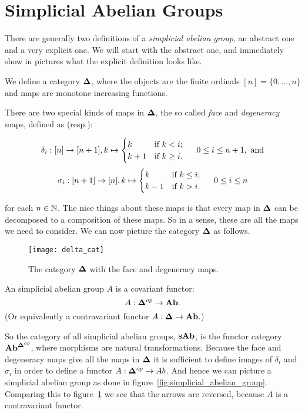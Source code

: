\section{Simplicial Abelian Groups}
\label{sec:Simplicial Abelian Groups}

There are generally two definitions of a \emph{simplicial abelian group}, an abstract one and a very explicit one. We will start with the abstract one, and immediately show in pictures what the explicit definition looks like.

\begin{definition}
	We define a category $\mathbf{\Delta}$, where the objects are the finite ordinals $[n] = \{0, \dots, n\}$ and maps are monotone increasing functions.
\end{definition}

There are two special kinds of maps in $\mathbf{\Delta}$, the so called \emph{face} and \emph{degeneracy} maps, defined as (resp.):

$$\delta_i: [n] \to [n+1], k \mapsto \begin{cases} k & \text{if } k < i;\\ k+1 & \text{if } k \geq i. \end{cases} \hspace{0.5cm} 0 \leq i \leq n+1, \text{ and}$$
$$\sigma_i: [n+1] \to [n], k \mapsto \begin{cases} k & \text{if } k \leq i;\\ k-1 & \text{if } k > i. \end{cases} \hspace{0.5cm} 0 \leq i \leq n$$

for each $n \in \mathbb{N}$. The nice things about these maps is that every map in $\mathbf{\Delta}$ can be decomposed to a composition of these maps.  So in a sense, these are all the maps we need to consider. We can now picture the category $\mathbf{\Delta}$ as follows.

\begin{figure}[h!]
	\label{fig:delta_cat}
	\texttt{[image: delta\_cat]}
	\caption{The category $\mathbf{\Delta}$ with the face and degeneracy maps.}
\end{figure}

\begin{definition}
	An simplicial abelian group $A$ is a covariant functor:
	$$A: \mathbf{\Delta}^{op} \to \mathbf{Ab}.$$
	(Or equivalently a contravariant functor $A: \mathbf{\Delta} \to \mathbf{Ab}.$)
\end{definition}

So the category of all simplicial abelian groups, $\mathbf{sAb}$, is the functor category $\mathbf{Ab}^{\mathbf{\Delta}^{op}}$, where morphisms are natural transformations. Because the face and degeneracy maps give all the maps in $\mathbf{\Delta}$ it is sufficient to define images of $\delta_i$ and $\sigma_i$ in order to define a functor $A: \mathbf{\Delta}^{op} \to Ab$. And hence we can picture a simplicial abelian group as done in figure~\ref{fig:simplicial_abelian_group}. Comparing this to figure~\ref{fig:delta_cat} we see that the arrows are reversed, because $A$ is a contravariant functor.

